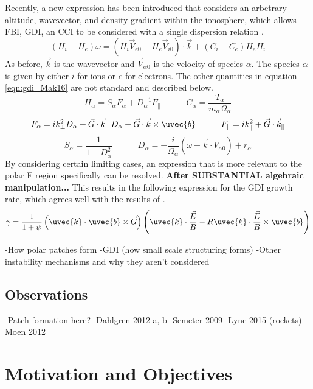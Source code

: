Recently, a new expression has been introduced that considers an arbetrary altitude, wavevector, and density gradient within the ionosphere, which allows FBI, GDI, an CCI to be considered with a single dispersion relation \citep{Makarevich2016a}.
\begin{equation}
	\label{eqn:gdi_Mak16}
	(H_i-H_e)\omega = (H_i\vec{V}_{e0}-H_e\vec{V}_{i0})\cdot\vec{k}+(C_i-C_e)H_eH_i
\end{equation}
As before, \(\vec{k}\) is the wavevector and \(\vec{V}_{\alpha 0}\) is the velocity of species \(\alpha\).  The species \(\alpha\) is given by either \(i\) for ions or \(e\) for electrons.  The other quantities in equation \ref{eqn:gdi_Mak16} are not standard and described below.
\begin{equation}
	H_\alpha = S_\alpha F_\alpha + D_\alpha^{-1} F_\parallel \quad\quad\quad
	C_\alpha = \frac{T_\alpha}{m_\alpha \Omega_\alpha}
\end{equation}
\begin{equation}
	F_\alpha = i k_\perp^2 D_\alpha + \vec{G}\cdot\vec{k}_\perp D_\alpha + \vec{G}\cdot\vec{k}\times\uvec{b} \quad\quad\quad
	F_\parallel = i k_\parallel^2 + \vec{G}\cdot\vec{k}_\parallel
\end{equation}
\begin{equation}
	S_\alpha = \frac{1}{1+D_\alpha^2} \quad\quad\quad
	D_\alpha = -\frac{i}{\Omega_\alpha}(\omega-\vec{k}\cdot{V}_{\alpha 0})+r_\alpha
\end{equation}
By considering certain limiting cases, an expression that is more relevant to the polar F region specifically can be resolved.  \textbf{After SUBSTANTIAL algebraic manipulation...}  This results in the following expression for the GDI growth rate, which agrees well with the results of \citet{Makarevitch2014c}.
\begin{equation}
	\label{eqn:gdi}
	\gamma = \frac{1}{1+\psi}\left(\uvec{k}\cdot\uvec{b}\times\vec{G}\right)\left(\uvec{k}\cdot\frac{\vec{E}}{B}-R\uvec{k}\cdot\frac{\vec{E}}{B}\times\uvec{b}\right)
\end{equation}



-How polar patches form
-GDI (how small scale structuring forms)
-Other instability mechanisms and why they aren't considered

\subsection{Observations}
-Patch formation here?
-Dahlgren 2012 a, b
-Semeter 2009
-Lyne 2015 (rockets)
-Moen 2012


\section{Motivation and Objectives}
